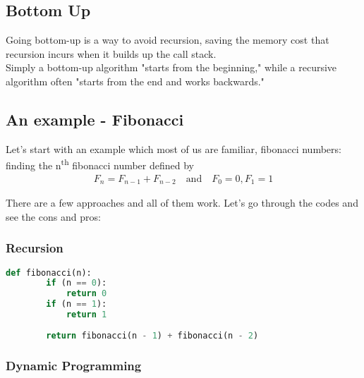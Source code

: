 \documentclass[12pt]{article}
\begin{document}
	\subsection{Bottom Up}
	Going bottom-up is a way to avoid recursion, saving the memory cost that recursion incurs when it builds up the call stack.\\

    Simply a bottom-up algorithm "starts from the beginning," while a recursive algorithm often "starts from the end and works backwards."
	
	\subsection{An example - Fibonacci}
	Let's start with an example which most of us are familiar, fibonacci numbers: finding the n\textsuperscript{th} fibonacci number defined by\\
    \begin{align*}
    F_n = F_{n-1} + F_{n-2} \quad \textrm{and} \quad F_0 = 0,   F_1 = 1
    \end{align*}
    
    There are a few approaches and all of them work. Let's go through the codes and see the cons and pros:
	\subsubsection{Recursion}
	
    \begin{lstlisting}[language=Python]
    def fibonacci(n):
        if (n == 0):
            return 0
        if (n == 1):
            return 1
    
        return fibonacci(n - 1) + fibonacci(n - 2)
    \end{lstlisting}

	\subsubsection{Dynamic Programming}
        
\end{document}

